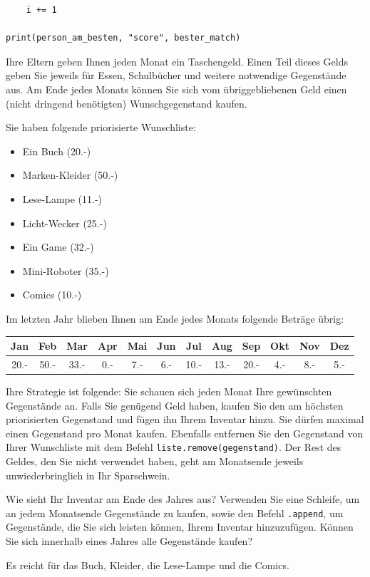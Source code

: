 \begin{questions}
\begin{parts}
\begin{solution}
\begin{lstlisting}
    i += 1

print(person_am_besten, "score", bester_match)
\end{lstlisting}
	\end{solution}
\end{parts}
\droptotalpoints

\clearpage
{}

Ihre Eltern geben Ihnen jeden Monat ein Taschengeld. Einen Teil dieses Gelds geben Sie jeweils für Essen, Schulbücher und weitere notwendige Gegenstände aus. Am Ende jedes Monats können Sie sich vom übriggebliebenen Geld einen (nicht dringend benötigten) Wunschgegenstand kaufen.

Sie haben folgende priorisierte Wunschliste: 
\begin{itemize}
	\item Ein Buch (20.-)
	\item Marken-Kleider (50.-)
	\item Lese-Lampe (11.-)
	\item Licht-Wecker (25.-)
	\item Ein Game (32.-)
	\item Mini-Roboter (35.-)
	\item Comics (10.-)
\end{itemize}

Im letzten Jahr blieben Ihnen am Ende jedes Monats folgende Beträge übrig: 
\begin{table}[H]
	\centering
	\begin{tabular}{c|c|c|c|c|c|c|c|c|c|c|c}
	Jan & Feb & Mar & Apr & Mai & Jun & Jul & Aug & Sep & Okt & Nov & Dez \\\hline
	20.- & 50.- & 33.- & 0.- & 7.- & 6.- & 10.- & 13.- & 20.- & 4.- & 8.- & 5.-
	\end{tabular}
\end{table}

Ihre Strategie ist folgende: Sie schauen sich jeden Monat Ihre gewünschten Gegenstände an. Falls Sie genügend Geld haben, kaufen Sie den am höchsten priorisierten Gegenstand und fügen ihn Ihrem Inventar hinzu. Sie dürfen maximal einen Gegenstand pro Monat kaufen. Ebenfalls entfernen Sie den Gegenstand von Ihrer Wunschliste mit dem Befehl \lstinline|liste.remove(gegenstand)|. Der Rest des Geldes, den Sie nicht verwendet haben, geht am Monatsende jeweils unwiederbringlich in Ihr Sparschwein.

Wie sieht Ihr Inventar am Ende des Jahres aus? Verwenden Sie eine Schleife, um an jedem Monatsende Gegenstände zu kaufen, sowie den Befehl \lstinline|.append|, um Gegenstände, die Sie sich leisten können, Ihrem Inventar hinzuzufügen. Können Sie sich innerhalb eines Jahres alle Gegenstände kaufen?
	\begin{solution}
		Es reicht für das Buch, Kleider, die Lese-Lampe und die Comics.
		

\end{solution}
\end{questions}
